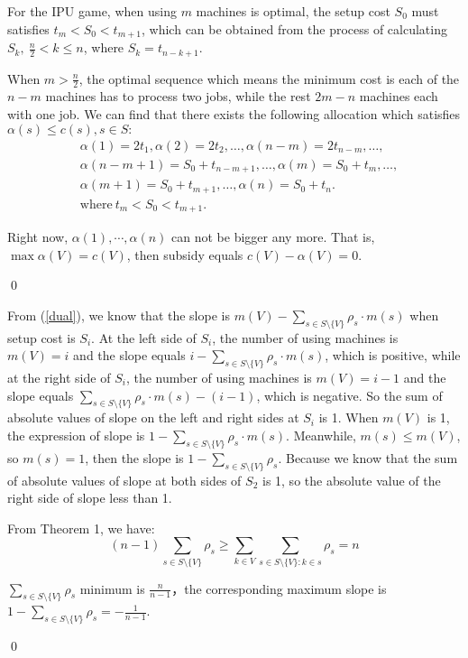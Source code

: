 \begin{pf}[Theorem 3]
For the IPU game, when using $m$ machines is optimal, the setup cost $S_0$ must satisfies $t_m < S_0 < t_{m+1}$, which can be obtained from the process of calculating $S_k,~\frac{n}{2} < k \leq n$, where $S_k = t_{n-k+1}$.

When $m > \frac{n}{2}$, the optimal sequence which means the minimum cost is each of the $n-m$ machines has to process two jobs, while the rest $2m-n$ machines each with one job. We can find that there exists the following allocation which satisfies $\alpha(s) \leq c(s), s \in S:$
\[
\begin{aligned}
&\alpha(1)=2t_1,\alpha(2)=2t_2,\ldots,\alpha(n-m)=2t_{n-m},\ldots,\\
&\alpha(n-m+1)=S_0+t_{n-m+1},\ldots,\alpha(m)=S_0+t_{m},\ldots,\\
&\alpha(m+1)=S_0+t_{m+1},\ldots,\alpha(n)=S_0+t_n.\\
&\text{where} \ t_m < S_0 < t_{m+1}.
\end{aligned}
\]

Right now, $\alpha(1),\cdots,\alpha(n)$ can not be bigger any more. That is, $\mathop{max} \alpha(V) = c(V)$, then subsidy equals $c(V)-\alpha(V) = 0$.

\qed
\end{pf}


\begin{pf}[Theorem 4]
From (\ref{dual}), we know that the slope is $m(V)-\sum_{s\in S \setminus\{V\}} \rho_s \cdot m(s)$ when setup cost is $S_i$. At the left side of $S_i$, the number of using machines is $m(V)=i$ and the slope equals $i-\sum_{s\in S \setminus\{V\}} \rho_s \cdot m(s)$, which is positive, while at the right side of $S_i$, the number of using machines is $m(V)=i-1$ and the slope equals $\sum_{s\in S \setminus\{V\}} \rho_s \cdot m(s) - (i-1)$,
which is negative. So the sum of absolute values of slope on the left and right sides at $S_i$ is 1.
When $m(V)$ is 1, the expression of slope is $1-\sum_{s\in S \setminus\{V\}} \rho_s \cdot m(s)$. Meanwhile, $m(s) \leq m(V)$, so $m(s) = 1$, then the slope is $1-\sum_{s\in S \setminus\{V\}} \rho_s $.
Because we know that the sum of absolute values of slope at both sides of $S_2$ is 1, so the absolute value of the right side of slope less than 1.

From Theorem 1, we have:
\begin{displaymath}
    (n-1) \sum_{s \in S \setminus\{V\} } \rho_s \geq
    \sum_{k\in V}\sum_{s \in S \setminus\{V\}:k \in s} \rho_s = n
\end{displaymath}

$\sum_{s \in S \setminus\{V\}} \rho_s $ minimum is $\frac{n}{n-1}$，the corresponding maximum slope is $ 1-\sum_{s\in S \setminus\{V\}} \rho_s =-\frac{1}{n-1}$.

\qed
\end{pf}

